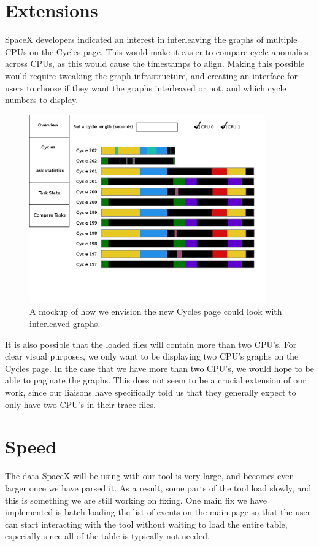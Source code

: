 \documentclass{hmcclinic}
\begin{document}
\section{Extensions}
  SpaceX developers indicated an interest in interleaving the graphs of multiple
  CPUs on the Cycles page.  This would make it easier to compare cycle
  anomalies across CPUs, as this would cause the timestamps to align. Making
  this possible would require tweaking the graph infrastructure, and creating an
  interface for users to choose if they want the graphs interleaved or not, and
  which cycle numbers to display.

  \begin{figure}[H]
\begin{center}
\includegraphics[width=4in]{futureCycles.png}
\caption{A mockup of how we envision the new Cycles page could look with
interleaved graphs.}
\end{center}
\end{figure}

It is also possible that the loaded files will contain more than two CPU's. For clear visual purposes, we only want to be displaying two CPU's graphs on the Cycles page. In the case that we have more than two CPU's, we would hope to be able to paginate the graphs. This does not seem to be a crucial extension of our work, since our liaisons have specifically told us that they generally expect to only have two CPU's in their trace files.


\section{Speed} %
The data SpaceX will be using with our tool is very large, and becomes even
larger once we have parsed it. As a result, some parts of the tool load slowly,
and this is something we are still working on fixing. One main fix we have
implemented is batch loading the list of events on the main page so that the
user can start interacting with the tool without waiting to load the entire
table, especially since all of the table is typically not needed.
\end{document}
